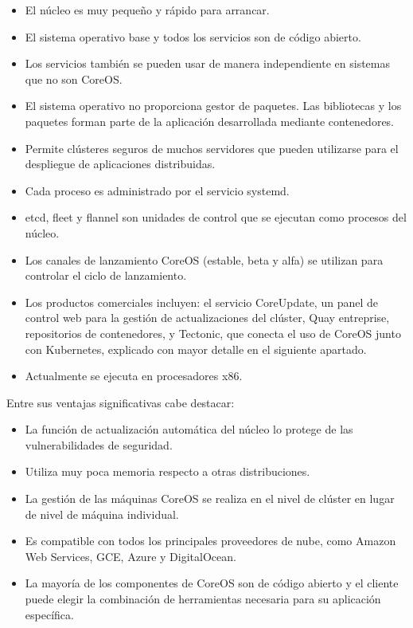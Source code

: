 \begin{itemize}
\item El núcleo es muy pequeño y rápido para arrancar.
\item El sistema operativo base y todos los servicios son de código abierto.
\item Los servicios también se pueden usar de manera independiente en sistemas que no son CoreOS.
\item El sistema operativo no proporciona gestor de paquetes. Las bibliotecas y los paquetes forman parte de la aplicación desarrollada mediante contenedores.
\item Permite clústeres seguros de muchos servidores que pueden utilizarse para el despliegue de aplicaciones distribuidas.
\item Cada proceso es administrado por el servicio systemd.
\item etcd, fleet y flannel son unidades de control que se ejecutan como procesos del núcleo.
\item Los canales de lanzamiento CoreOS (estable, beta y alfa) se utilizan para controlar el ciclo de lanzamiento.
\item Los productos comerciales incluyen: el servicio CoreUpdate, un panel de control web para la gestión de actualizaciones del clúster, Quay entreprise, repositorios de contenedores, y Tectonic, que conecta el uso de CoreOS junto con Kubernetes, explicado con mayor detalle en el siguiente apartado.
\item Actualmente se ejecuta en procesadores x86.
\end{itemize}

Entre sus ventajas significativas cabe destacar:

\begin{itemize}
\item La función de actualización automática del núcleo lo protege de las vulnerabilidades de seguridad.
\item Utiliza muy poca memoria respecto a otras distribuciones.
\item La gestión de las máquinas CoreOS se realiza en el nivel de clúster en lugar de nivel de máquina individual.
\item Es compatible con todos los principales proveedores de nube, como Amazon Web Services, GCE, Azure y DigitalOcean.
\item La mayoría de los componentes de CoreOS son de código abierto y el cliente puede elegir la combinación de herramientas necesaria para su aplicación específica.
\end{itemize}

